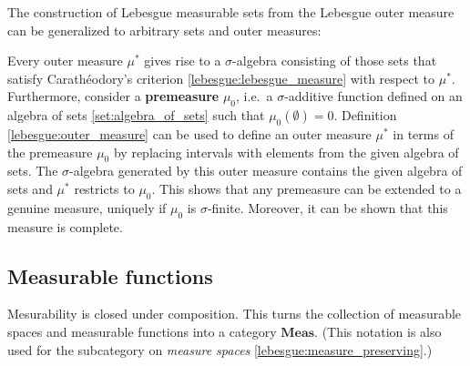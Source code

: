     The construction of Lebesgue measurable sets from the Lebesgue outer measure can be generalized to arbitrary sets and outer measures:
    \begin{construct}\label{lebesgue:caratheodory}
        Every outer measure $\mu^*$ gives rise to a $\sigma$-algebra consisting of those sets that satisfy Carath\'eodory's criterion \ref{lebesgue:lebesgue_measure} with respect to $\mu^*$. Furthermore, consider a \textbf{premeasure} $\mu_0$, i.e.~a $\sigma$-additive function defined on an algebra of sets \ref{set:algebra_of_sets} such that $\mu_0(\emptyset) = 0$. Definition \ref{lebesgue:outer_measure} can be used to define an outer measure $\mu^*$ in terms of the premeasure $\mu_0$ by replacing intervals with elements from the given algebra of sets. The $\sigma$-algebra generated by this outer measure contains the given algebra of sets and $\mu^*$ restricts to $\mu_0$. This shows that any premeasure can be extended to a genuine measure, uniquely if $\mu_0$ is $\sigma$-finite. Moreover, it can be shown that this measure is complete.
    \end{construct}

\subsection{Measurable functions}

    \begin{property}
        Mesurability is closed under composition. This turns the collection of measurable spaces and measurable functions into a category $\mathbf{Meas}$. (This notation is also used for the subcategory on \textit{measure spaces} \ref{lebesgue:measure_preserving}.)
    \end{property}


